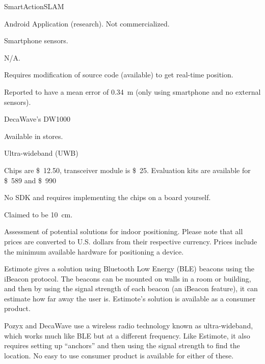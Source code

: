 \begin{table}[!htb]
\begin{description}[style=multiline,leftmargin=2.5cm]
        \item[Product:] SmartActionSLAM \cite{SASLAM}
        \item[Availability:] Android Application (research). Not commercialized.
        \item[Technology:] Smartphone sensors.
        \item[Price:] N/A.
        \item[Ease of use:] Requires modification of source code (available) to get real-time position. 
        \item[Accuracy:] Reported to have a mean error of \SI{0.34}{\meter} (only using smartphone and no external sensors).\\
        
        \item[Product:] DecaWave's DW1000 \cite{decawave}
        \item[Availability:] Available in stores. 
        \item[Technology:] Ultra-wideband (UWB)
        \item[Price:] Chips are \SI{12.50}[\$]{}, transceiver module is \SI{25}[\$]{}. Evaluation kits are available for \SI{589}[\$]{} and \SI{990}[\$]{} 
        \item[Ease of use:] No SDK and requires implementing the chips on a board yourself. 
        \item[Accuracy:] Claimed to be \SI{10}{\centi\meter}. 
        \end{description}
    \caption{Assessment of potential solutions for indoor positioning. Please note that all prices are converted to U.S. dollars from their respective currency. Prices include the minimum available hardware for positioning a device.}
    \label{tbl:indoor-positioning}
\end{table}

Estimote gives a solution using Bluetooth Low Energy (BLE) beacons using the iBeacon protocol. 
The beacons can be mounted on walls in a room or building, 
and then by using the signal strength of each beacon (an iBeacon feature), 
it can estimate how far away the user is. 
Estimote's solution is available as a consumer product.

Pozyx and DecaWave use a wireless radio technology known as ultra-wideband, which works much like BLE but at a different frequency. 
Like Estimote, it also requires setting up ``anchors'' and then using the signal strength to find the location. 
No easy to use consumer product is available for either of these.

